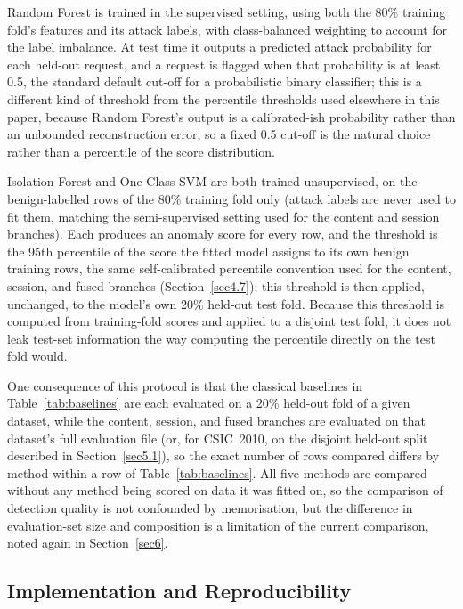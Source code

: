 \documentclass[futureinternet,article,submit,moreauthors]{Definitions/mdpi}
\begin{document}
Random Forest is trained in the supervised setting, using both the 80\% training fold's features and its attack labels, with class-balanced weighting to account for the label imbalance. At test time it outputs a predicted attack probability for each held-out request, and a request is flagged when that probability is at least 0.5, the standard default cut-off for a probabilistic binary classifier; this is a different kind of threshold from the percentile thresholds used elsewhere in this paper, because Random Forest's output is a calibrated-ish probability rather than an unbounded reconstruction error, so a fixed 0.5 cut-off is the natural choice rather than a percentile of the score distribution.

Isolation Forest and One-Class SVM are both trained unsupervised, on the benign-labelled rows of the 80\% training fold only (attack labels are never used to fit them, matching the semi-supervised setting used for the content and session branches). Each produces an anomaly score for every row, and the threshold is the 95th percentile of the score the fitted model assigns to its own benign training rows, the same self-calibrated percentile convention used for the content, session, and fused branches (Section~\ref{sec4.7}); this threshold is then applied, unchanged, to the model's own 20\% held-out test fold. Because this threshold is computed from training-fold scores and applied to a disjoint test fold, it does not leak test-set information the way computing the percentile directly on the test fold would.

One consequence of this protocol is that the classical baselines in Table~\ref{tab:baselines} are each evaluated on a 20\% held-out fold of a given dataset, while the content, session, and fused branches are evaluated on that dataset's full evaluation file (or, for CSIC~2010, on the disjoint held-out split described in Section~\ref{sec5.1}), so the exact number of rows compared differs by method within a row of Table~\ref{tab:baselines}. All five methods are compared without any method being scored on data it was fitted on, so the comparison of detection quality is not confounded by memorisation, but the difference in evaluation-set size and composition is a limitation of the current comparison, noted again in Section~\ref{sec6}.

\subsection{Implementation and Reproducibility}
\end{document}
